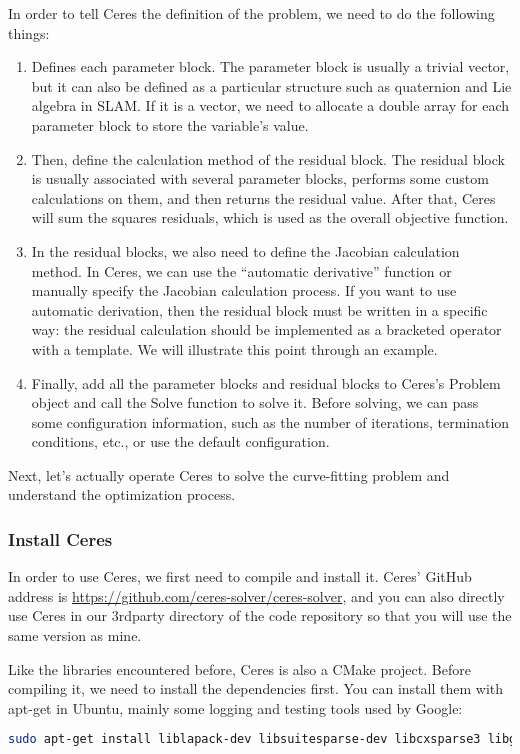 In order to tell Ceres the definition of the problem, we need to do the following things:
\begin{enumerate}
    \item Defines each parameter block. The parameter block is usually a trivial vector, but it can also be defined as a particular structure such as quaternion and Lie algebra in SLAM. If it is a vector, we need to allocate a double array for each parameter block to store the variable's value.
    \item Then, define the calculation method of the residual block. The residual block is usually associated with several parameter blocks, performs some custom calculations on them, and then returns the residual value. After that, Ceres will sum the squares residuals, which is used as the overall objective function.
    \item In the residual blocks, we also need to define the Jacobian calculation method. In Ceres, we can use the ``automatic derivative'' function or manually specify the Jacobian calculation process. If you want to use automatic derivation, then the residual block must be written in a specific way: the residual calculation should be implemented as a bracketed operator with a template. We will illustrate this point through an example.
    \item Finally, add all the parameter blocks and residual blocks to Ceres's Problem object and call the Solve function to solve it. Before solving, we can pass some configuration information, such as the number of iterations, termination conditions, etc., or use the default configuration.
\end{enumerate}
Next, let's actually operate Ceres to solve the curve-fitting problem and understand the optimization process.

\subsubsection{Install Ceres}
In order to use Ceres, we first need to compile and install it. Ceres' GitHub address is \url{https://github.com/ceres-solver/ceres-solver}, and you can also directly use Ceres in our 3rdparty directory of the code repository so that you will use the same version as mine.

Like the libraries encountered before, Ceres is also a CMake project. Before compiling it, we need to install the dependencies first. You can install them with apt-get in Ubuntu, mainly some logging and testing tools used by Google:
\begin{lstlisting}[language=sh,caption=Terminal input: ]
sudo apt-get install liblapack-dev libsuitesparse-dev libcxsparse3 libgflags-dev libgoogle-glog-dev libgtest-dev 
\end{lstlisting}


